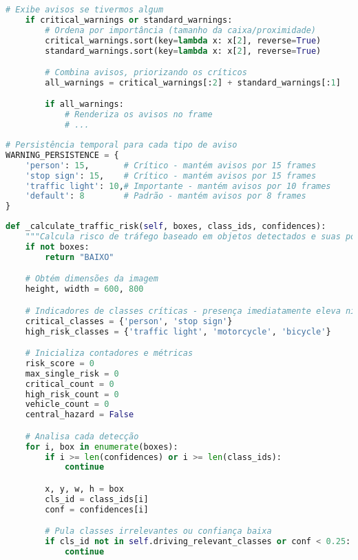 \documentclass[
	12pt,				%
	oneside, %
	a4paper,			%
	english,			%
	french,				%
	spanish,			%
	brazil				%
	]{abntex2}
\begin{document}
\begin{apendicesenv}
\begin{lstlisting}[language=Python, caption=Implementação do sistema de \textit{feedback} visual., label=lst:add_warnings]
    # Exibe avisos se tivermos algum
    if critical_warnings or standard_warnings:
        # Ordena por importância (tamanho da caixa/proximidade)
        critical_warnings.sort(key=lambda x: x[2], reverse=True)
        standard_warnings.sort(key=lambda x: x[2], reverse=True)

        # Combina avisos, priorizando os críticos
        all_warnings = critical_warnings[:2] + standard_warnings[:1]

        if all_warnings:
            # Renderiza os avisos no frame
            # ...
\end{lstlisting}

\begin{lstlisting}[language=Python, caption=Constantes de persistência para avisos visuais., label=lst:warning_persistence]
# Persistência temporal para cada tipo de aviso
WARNING_PERSISTENCE = {
    'person': 15,       # Crítico - mantém avisos por 15 frames
    'stop sign': 15,    # Crítico - mantém avisos por 15 frames
    'traffic light': 10,# Importante - mantém avisos por 10 frames
    'default': 8        # Padrão - mantém avisos por 8 frames
}
\end{lstlisting}

\begin{lstlisting}[language=Python, caption=Método de cálculo de risco de tráfego., label=lst:calculate_traffic_risk]
def _calculate_traffic_risk(self, boxes, class_ids, confidences):
    """Calcula risco de tráfego baseado em objetos detectados e suas posições"""
    if not boxes:
        return "BAIXO"

    # Obtém dimensões da imagem
    height, width = 600, 800

    # Indicadores de classes críticas - presença imediatamente eleva nível de risco
    critical_classes = {'person', 'stop sign'}
    high_risk_classes = {'traffic light', 'motorcycle', 'bicycle'}

    # Inicializa contadores e métricas
    risk_score = 0
    max_single_risk = 0
    critical_count = 0
    high_risk_count = 0
    vehicle_count = 0
    central_hazard = False

    # Analisa cada detecção
    for i, box in enumerate(boxes):
        if i >= len(confidences) or i >= len(class_ids):
            continue

        x, y, w, h = box
        cls_id = class_ids[i]
        conf = confidences[i]

        # Pula classes irrelevantes ou confiança baixa
        if cls_id not in self.driving_relevant_classes or conf < 0.25:
            continue


\end{lstlisting}
\end{apendicesenv}
\end{document}
